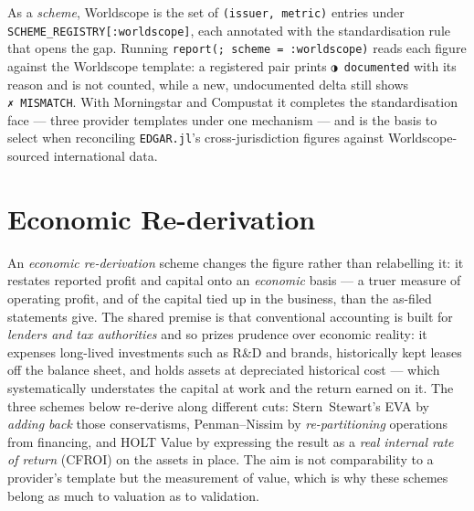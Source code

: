 \documentclass[11pt,a4paper]{report}
\newcommand{\statmark}[1]{{\symbolfont #1}}
\begin{document}
As a \emph{scheme}, Worldscope is the set of \texttt{(issuer, metric)} entries under
\texttt{SCHEME\_REGISTRY[:worldscope]}, each annotated with the standardisation rule that opens the gap.
Running \texttt{report(; scheme = :worldscope)} reads each figure against the Worldscope template: a registered
pair prints \texttt{\statmark{◑}~documented} with its reason and is not counted, while a new, undocumented delta still
shows \texttt{\statmark{✗}~MISMATCH}. With Morningstar and Compustat it completes the standardisation face --- three
provider templates under one mechanism --- and is the basis to select when reconciling \texttt{EDGAR.jl}'s
cross-jurisdiction figures against Worldscope-sourced international data.

\section{Economic Re-derivation}
\label{sec:schemes-rederivation}

An \emph{economic re-derivation} scheme changes the figure rather than relabelling it: it restates reported
profit and capital onto an \emph{economic} basis --- a truer measure of operating profit, and of the capital
tied up in the business, than the as-filed statements give. The shared premise is that conventional accounting
is built for \emph{lenders and tax authorities} and so prizes prudence over economic reality: it expenses
long-lived investments such as R\&D and brands, historically kept leases off the balance sheet, and holds
assets at depreciated historical cost --- which systematically understates the capital at work and the return
earned on it. The three schemes below re-derive along different cuts: Stern~Stewart's EVA by \emph{adding back}
those conservatisms, Penman--Nissim by \emph{re-partitioning} operations from financing, and HOLT Value by
expressing the result as a \emph{real internal rate of return} (CFROI) on the assets in place. The aim is not
comparability to a provider's template but the measurement of value, which is why these schemes belong as much
to valuation as to validation.
\end{document}

